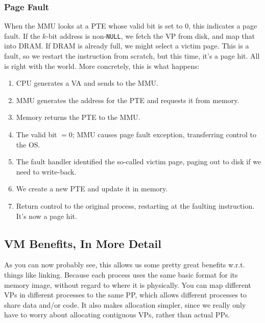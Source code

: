 \documentclass[fleqn]{article}
\begin{document}
\subsubsection{Page Fault}

When the MMU looks at a PTE whose valid bit is set to 0, this indicates a page fault. If the $k$-bit address is non-\texttt{NULL}, we fetch the VP from disk, and map that into DRAM. If DRAM is already full, we might select a victim page. This is a fault, so we restart the instruction from scratch, but this time, it's a page hit. All is right with the world. More concretely, this is what happens:

\begin{enumerate}
\item CPU generates a VA and sends to the MMU.

\item MMU generates the address for the PTE and requests it from memory.

\item Memory returns the PTE to the MMU.

\item The valid bit $=0$; MMU causes page fault exception, transferring control to the OS.

\item The fault handler identified the so-called victim page, paging out to disk if we need to write-back.

\item We create a new PTE and update it in memory.

\item Return control to the original process, restarting at the faulting instruction. It's now a page hit.
\end{enumerate}


\subsection{VM Benefits, In More Detail}

As you can now probably see, this allows us some pretty great benefits w.r.t. things like linking. Because each process uses the same basic format for its memory image, without regard to where it is physically. You can map different VPs in different processes to the same PP, which allows different processes to share data and/or code. It also makes allocation simpler, since we really only have to worry about allocating contiguous VPs, rather than actual PPs.
\end{document}
